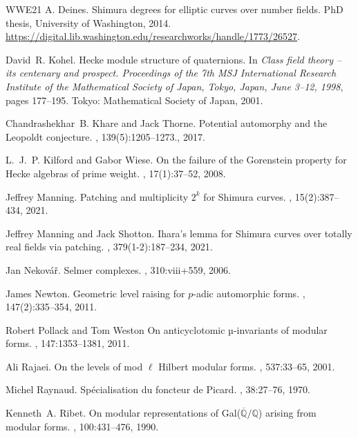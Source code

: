 \documentclass[a4paper, notitlepage, 10pt]{amsart}
\theoremstyle{plain} %
\theoremstyle{definition} %
\theoremstyle{remark} %
\numberwithin{equation}{section}
\newcommand{\bbQ}{\mathbb Q}
\begin{document}
\begin{thebibliography}{WWE21}
A. Deines.
\newblock Shimura degrees for elliptic curves over number fields.
\newblock PhD thesis, University of Washington, 2014.
\newblock \url{https://digital.lib.washington.edu/researchworks/handle/1773/26527}.

David~R. Kohel.
\newblock Hecke module structure of quaternions.
\newblock In {\em Class field theory -- its centenary and prospect. Proceedings of the 7th MSJ International Research Institute of the Mathematical Society of Japan, Tokyo, Japan, June 3--12, 1998}, pages 177--195. Tokyo: Mathematical Society of Japan, 2001.

Chandrashekhar~B. Khare and Jack  Thorne.
\newblock Potential automorphy and the {L}eopoldt conjecture.
, 139(5):1205--1273., 2017.

L.~J.~P. Kilford and Gabor Wiese.
\newblock On the failure of the {Gorenstein} property for {Hecke} algebras of prime weight.
, 17(1):37--52, 2008.

Jeffrey Manning.
\newblock Patching and multiplicity $2^k$ for {Shimura} curves.
, 15(2):387--434, 2021.

Jeffrey Manning and Jack Shotton.
\newblock Ihara's lemma for {Shimura} curves over totally real fields via patching.
, 379(1-2):187--234, 2021.

Jan Nekovář.
\newblock Selmer complexes.
, 310:viii+559, 2006.

James Newton.
\newblock Geometric level raising for {{\(p\)}}-adic automorphic forms.
, 147(2):335--354, 2011.

Robert Pollack and Tom Weston
\newblock On anticyclotomic µ-invariants of modular forms.
, 147:1353--1381, 2011.

Ali Rajaei.
\newblock On the levels of mod $\ell$ {H}ilbert modular forms.
, 537:33--65, 2001.

Michel Raynaud.
\newblock Spécialisation du foncteur de {Picard}.
, 38:27--76, 1970.

Kenneth~A. Ribet.
\newblock On modular representations of {Gal($\overline{\bbQ}/\bbQ$)} arising from modular forms.
, 100:431--476, 1990.


\end{thebibliography}
\end{document}
